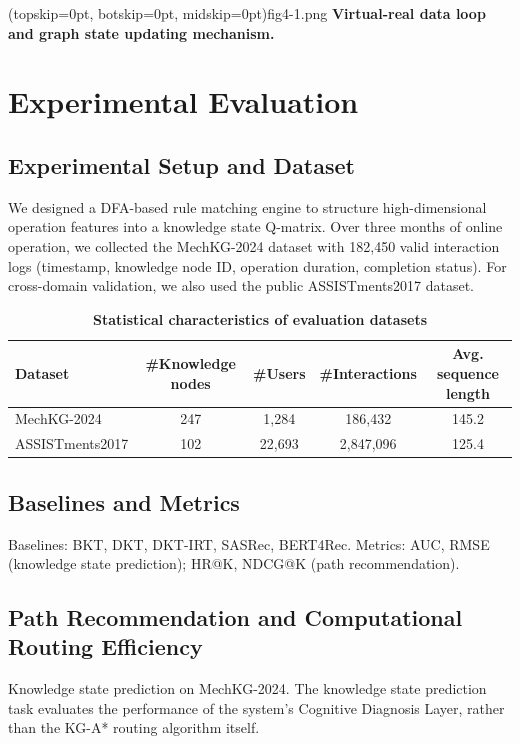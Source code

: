 \documentclass{ieeeaccess}
\begin{document}
\Figure[t!](topskip=0pt, botskip=0pt, midskip=0pt){fig4-1.png}
{ \textbf{Virtual-real data loop and graph state updating mechanism.}\label{fig4-1}}

\section{Experimental Evaluation}
\label{sec:experiments}

\subsection{Experimental Setup and Dataset}
We designed a DFA-based rule matching engine to structure high-dimensional operation features into a knowledge state Q-matrix. Over three months of online operation, we collected the MechKG-2024 dataset with 182,450 valid interaction logs (timestamp, knowledge node ID, operation duration, completion status). For cross-domain validation, we also used the public ASSISTments2017 dataset.

\begin{table}[t]
\setlength{\belowcaptionskip}{0pt}
\caption{\textbf{Statistical characteristics of evaluation datasets}}
\label{table5-1}
\setlength{\tabcolsep}{3pt}
\small
\begin{tabularx}{\linewidth}{|l|C|C|C|C|}
\hline
\textbf{Dataset} & \textbf{\#Knowledge nodes} & \textbf{\#Users} & \textbf{\#Interactions} & \textbf{Avg. sequence length} \\
\hline
MechKG-2024 & 247 & 1,284 & 186,432 & 145.2 \\
ASSISTments2017 & 102 & 22,693 & 2,847,096 & 125.4 \\
\hline
\end{tabularx}
\end{table}

\subsection{Baselines and Metrics}
Baselines: BKT, DKT, DKT-IRT, SASRec, BERT4Rec. Metrics: AUC, RMSE (knowledge state prediction); HR@K, NDCG@K (path recommendation).

\subsection{Path Recommendation and Computational Routing Efficiency}
Knowledge state prediction on MechKG-2024. The knowledge state prediction task evaluates the performance of the system's Cognitive Diagnosis Layer, rather than the KG-A* routing algorithm itself.
\end{document}
